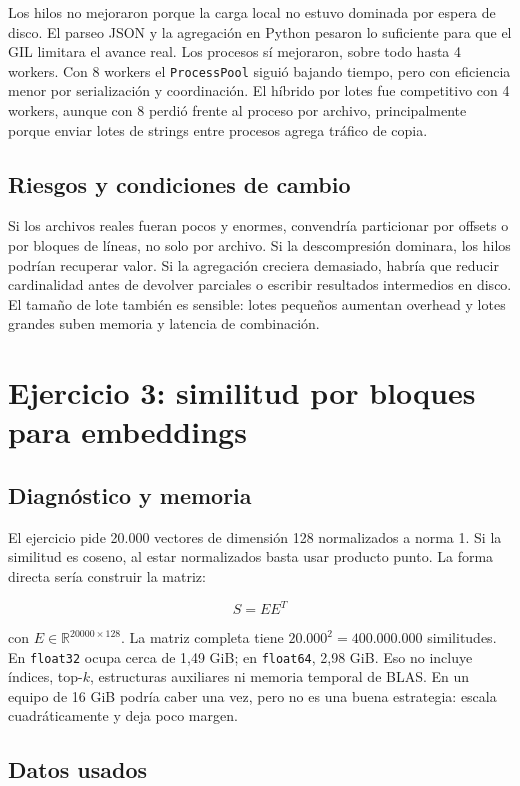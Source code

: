 \documentclass[letterpaper,11pt]{article}
\begin{document}
Los hilos no mejoraron porque la carga local no estuvo dominada por espera de disco. El parseo JSON y la agregación en Python pesaron lo suficiente para que el GIL limitara el avance real. Los procesos sí mejoraron, sobre todo hasta 4 workers. Con 8 workers el \texttt{ProcessPool} siguió bajando tiempo, pero con eficiencia menor por serialización y coordinación. El híbrido por lotes fue competitivo con 4 workers, aunque con 8 perdió frente al proceso por archivo, principalmente porque enviar lotes de strings entre procesos agrega tráfico de copia.

\subsection{Riesgos y condiciones de cambio}

Si los archivos reales fueran pocos y enormes, convendría particionar por offsets o por bloques de líneas, no solo por archivo. Si la descompresión dominara, los hilos podrían recuperar valor. Si la agregación creciera demasiado, habría que reducir cardinalidad antes de devolver parciales o escribir resultados intermedios en disco. El tamaño de lote también es sensible: lotes pequeños aumentan overhead y lotes grandes suben memoria y latencia de combinación.

\section{Ejercicio 3: similitud por bloques para embeddings}

\subsection{Diagnóstico y memoria}

El ejercicio pide 20.000 vectores de dimensión 128 normalizados a norma 1. Si la similitud es coseno, al estar normalizados basta usar producto punto. La forma directa sería construir la matriz:

\[
S = E E^T
\]

con \(E \in \mathbb{R}^{20000 \times 128}\). La matriz completa tiene \(20.000^2 = 400.000.000\) similitudes. En \texttt{float32} ocupa cerca de 1,49 GiB; en \texttt{float64}, 2,98 GiB. Eso no incluye índices, top-\(k\), estructuras auxiliares ni memoria temporal de BLAS. En un equipo de 16 GiB podría caber una vez, pero no es una buena estrategia: escala cuadráticamente y deja poco margen.

\subsection{Datos usados}
\end{document}

